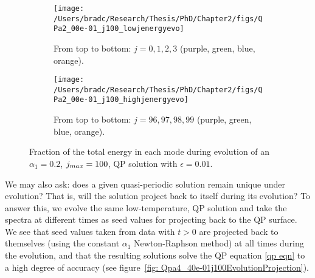 \documentclass[../PhD.tex]{subfiles}
\begin{document}
\begin{figure}[H]
	\centering
	\begin{subfigure}[t]{0.47\textwidth}
		\texttt{[image: /Users/bradc/Research/Thesis/PhD/Chapter2/figs/QPa2\_00e-01\_j100\_lowjenergyevo]}
		\caption{From top to bottom: $j=0, 1, 2, 3$ (purple, green, blue, orange).}
	\end{subfigure}
	\hfill
	\begin{subfigure}[t]{0.47\textwidth}
		\texttt{[image: /Users/bradc/Research/Thesis/PhD/Chapter2/figs/QPa2\_00e-01\_j100\_highjenergyevo]}
		\caption{From top to bottom: $j=96, 97, 98, 99$ (purple, green, blue, orange).}
	\end{subfigure}
	\caption[Evolution of QP solutions at low temperature]{Fraction of the total energy in each mode during evolution of an $\alpha_1 = 0.2$, $j_{max} = 100$, QP solution with $\epsilon=0.01$.}
	\label{fig:qpevo}
\end{figure}



We may also ask: does a given quasi-periodic solution remain unique under evolution? That is, will the solution project back to itself during its evolution? To answer this, we evolve the same low-temperature, QP solution and take the spectra at different times as seed values for projecting back to the QP surface. We see that seed values taken from data with $t > 0$ are projected back to themselves (using the constant $\alpha_1$ Newton-Raphson method) at all times during the evolution, and that the resulting solutions solve the QP equation \eqref{qp eqn} to a high degree of accuracy (see figure~\ref{fig: Qpa4_40e-01j100EvolutionProjection}). 
\end{document}
